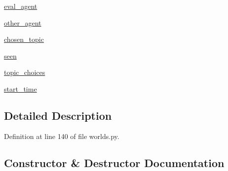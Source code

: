 \begin{DoxyCompactItemize}
\item 
\hyperlink{classmturk__evaluation__task_1_1worlds_1_1WizardEval_a3d6abd4df1554f895e89d7398a042bc2}{eval\+\_\+agent}
\item 
\hyperlink{classmturk__evaluation__task_1_1worlds_1_1WizardEval_aad5ea6aed753f2cd77f83f8e0faa606f}{other\+\_\+agent}
\item 
\hyperlink{classmturk__evaluation__task_1_1worlds_1_1WizardEval_a7994daa0513a1cff09d6ff87ce3c5059}{chosen\+\_\+topic}
\item 
\hyperlink{classmturk__evaluation__task_1_1worlds_1_1WizardEval_ae991a980a424300cc6f34a258e2b2ec1}{seen}
\item 
\hyperlink{classmturk__evaluation__task_1_1worlds_1_1WizardEval_a25995e126c71371f88770405cb340771}{topic\+\_\+choices}
\item 
\hyperlink{classmturk__evaluation__task_1_1worlds_1_1WizardEval_a7e662f455a6bae94aaed9af9e8636766}{start\+\_\+time}
\end{DoxyCompactItemize}


\subsection{Detailed Description}


Definition at line 140 of file worlds.\+py.



\subsection{Constructor \& Destructor Documentation}
\mbox{\label{classmturk__evaluation__task_1_1worlds_1_1WizardEval_a1ec4e39e799dad1ac1ac7a0720cd7423}} 
